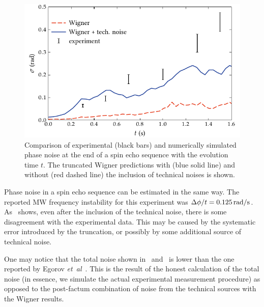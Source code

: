 \begin{figure}
    \centerline{\includegraphics{figures_generated/bec_noise/echo_noise.pdf}}

    \caption[Experimental and numerically simulated phase noise in spin echo sequence]{
    Comparison of experimental (black bars) and numerically simulated phase noise at the end of a spin echo sequence with the evolution time $t$.
    The truncated Wigner predictions with (blue solid line) and without (red dashed line) the inclusion of technical noises is shown.}%

    \label{fig:bec-noise:phase-noise:echo-phnoise}
\end{figure}

Phase noise in a spin echo sequence can be estimated in the same way.
The reported MW frequency instability for this experiment was $\Delta \phi / t = 0.125\mbox{\ensuremath{\,\mathrm{rad/s}}}$.
As~ shows, even after the inclusion of the technical noise, there is some disagreement with the experimental data.
This may be caused by the systematic error introduced by the truncation, or possibly by some additional source of technical noise.

One may notice that the total noise shown in~ and~ is lower than the one reported by Egorov \textit{et~al}~\cite{Egorov2011,Egorov2012}.
This is the result of the honest calculation of the total noise (in essence, we simulate the actual experimental measurement procedure) as opposed to the post-factum combination of noise from the technical sources with the Wigner results.
